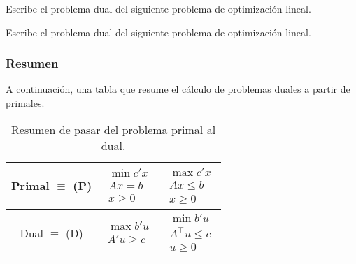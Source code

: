 \begin{example}
Escribe el problema dual del siguiente problema de optimización lineal.

\begin{ioprob}
\end{ioprob}





\end{example}

\begin{example}
Escribe el problema dual del siguiente problema de optimización lineal.

\begin{ioprob}
\end{ioprob}

\end{example}


\subsubsection{Resumen}

A continuación, una tabla que resume el cálculo de problemas duales a partir de primales.
\begin{table}[hbtp]
\centering
\begin{tabular}{c|c|c}
Primal $\equiv$ (P) & $\begin{array}{c} \min c'x\\Ax = b\\x≥ 0\end{array}$ & $\begin{array}{c} \max c'x\\Ax ≤ b\\x≥ 0\end{array}$\\
\hline
Dual $\equiv$ (D) & $\begin{array}{c} \max b'u\\A'u ≥ c\end{array}$ & $\begin{array}{c} \min b'u\\A^\top u ≤ c\\u≥ 0\end{array}$\\
\end{tabular}
\caption{Resumen de pasar del problema primal al dual.}
\end{table}



